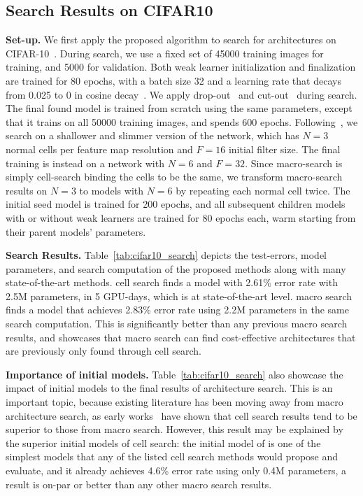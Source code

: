 \subsection{Search Results on CIFAR10}
\label{sec:experiment_cifar10_search}

\textbf{Set-up.}
We first apply the proposed algorithm to search for architectures on CIFAR-10~\citep{cifar}. During search, we use a fixed set of 45000 training images for training, and 5000 for validation. Both weak learner initialization and finalization are trained for 80 epochs, with a batch size 32 and a learning rate that decays from 0.025 to 0 in cosine decay~\citep{cosine_lr}. We apply drop-out~\citep{larsson2016fractalnet} and cut-out~\citep{cutout} during search. The final found model is trained from scratch using the same parameters, except that it trains on all 50000 training images, and spends 600 epochs. 
Following~\citep{NASCell,Liu2018DARTSDA}, we search on a shallower and slimmer version of the network, which has $N=3$ normal cells per feature map resolution and $F=16$ initial filter size. The final training is instead on a network with $N=6$ and $F=32$. Since \Petridish macro-search is simply cell-search binding the cells to be the same, we transform macro-search results on $N=3$ to models with $N=6$ by repeating each normal cell twice. 
The initial seed model is trained for 200 epochs, and all subsequent children models with or without weak learners are trained for 80 epochs each, warm starting from their parent models' parameters. 

\textbf{Search Results.} 
Table~\ref{tab:cifar10_search} depicts the test-errors, model parameters, and search computation of the proposed methods along with many state-of-the-art methods.
\Petridish cell search finds a model with 2.61\% error rate with 2.5M parameters, in 5 GPU-days, which is at state-of-the-art level. \Petridish macro search finds a model that achieves 2.83\% error rate using 2.2M parameters in the same search computation. This is significantly better than any previous macro search results, 
and showcases that macro search can find cost-effective architectures that are previously only found through cell search. 

\textbf{Importance of initial models.}
Table~\ref{tab:cifar10_search} also showcase the impact of initial models to the final results of architecture search. This is an important topic, because existing literature has been moving away from macro architecture search, as early works~\citep{NASCell,Pham2018EfficientNA,Real2018RegularizedEF} have shown that cell search results tend to be superior to those from macro search. However, this result may be explained by the superior initial models of cell search: the initial model of \Petridish is one of the simplest models that any of the listed cell search methods would propose and evaluate, and it already achieves 4.6\% error rate using only 0.4M parameters, a result is on-par or better than any other macro search results. 


